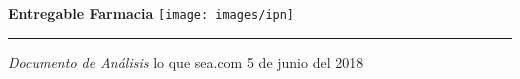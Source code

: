 \documentclass[10pt]{book}
\begin{document}
\begin{titlepage}
  \vspace*{4cm}
  {\fontsize{28}{34}\selectfont\bfseries Entregable Farmacia}
  \hfill
  \texttt{[image: images/ipn]} \\
  {
  \color{gris}\hrule}
  \Large{\itshape Documento de Análisis}
  \vfill
  {\large lo que sea.com \hfill 5 de junio del 2018}
\end{titlepage}








\end{document}
